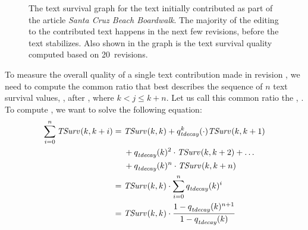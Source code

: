 \begin{figure}[tbph]
\centering
{}
\caption{The text survival graph for the text initially contributed
	as part of the article \textit{Santa Cruz Beach Boardwalk}.
	The majority of the editing to the contributed text happens
	in the next few revisions, before the text stabilizes.
	Also shown in the graph is the text survival quality
	computed based on 20~revisions.
	}
\label{fig:ts-SantaCruzBeachBoardwalk}
\end{figure}

To measure the overall quality of a single text contribution
made in revision , we need to compute the common ratio
that best describes the sequence of $n$ text survival values,
, after , where $k < j \le k+n$.
Let us call this common ratio the ,
.
To compute , we want to solve the following equation:
\begin{align*}
    \sum_{i=0}^n \tsurv{}{k,k+i} = {} & \tsurv{}{k,k} + \quality{tdecay}{k} \cdot \tsurv{}{k,k+1} \\
    & + \quality{tdecay}{}{k}^2 \cdot \tsurv{}{k,k+2} + \ldots \\
    & + \quality{tdecay}{}{k}^n \cdot \tsurv{}{k,k+n} \\
    = {} & \tsurv{}{k,k} \cdot \sum_{i=0}^n \quality{tdecay}{}{k}^i \\
    = {} & \tsurv{}{k,k} \cdot \frac{1 - \quality{tdecay}{}{k}^{n+1}}{1 - \quality{tdecay}{}{k}} \\
\end{align*}

